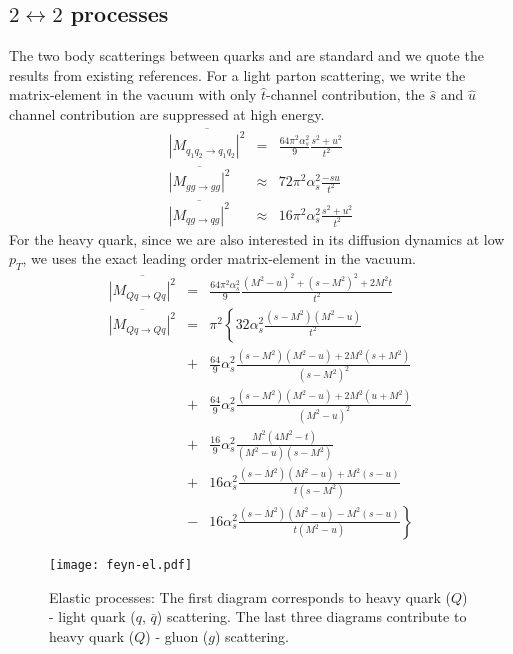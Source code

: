 \subsection{$2\leftrightarrow 2$ processes}
The two body scatterings between quarks and are standard and we quote the results from existing references.
For a light parton scattering, we write the matrix-element in the vacuum with only $\hat{t}$-channel contribution, the $\hat{s}$ and $\hat{u}$ channel contribution are suppressed at high energy.
\begin{eqnarray}
\overline{|M_{q_1q_2\rightarrow q_1q_2}|^2} &=& \frac{64\pi^2 \alpha_s^2}{9} \frac{s^2+u^2}{t^2} \\
\overline{|M_{gg\rightarrow gg}|^2} &\approx& 72\pi^2 \alpha_s^2 \frac{-su}{t^2}
 \\
\overline{|M_{qg\rightarrow qg}|^2} &\approx& 16\pi^2 \alpha_s^2 \frac{s^2+u^2}{t^2}
\end{eqnarray}
For the heavy quark, since we are also interested in its diffusion dynamics at low $p_T$, we uses the exact leading order matrix-element in the vacuum.
\begin{eqnarray}
\overline{|M_{Qq\rightarrow Qq}|^2} &=& \frac{64\pi^2\alpha_s^2}{9} \frac{(M^2-u)^2 + (s-M^2)^2 + 2 M^2 t}{t^2}
\nonumber
\\
\overline{|M_{Qq\rightarrow Qq}|^2} &=& \pi^2 \left\{
32\alpha_s^2 \frac{(s-M^2)(M^2-u)}{t^2} \right.
\nonumber
\\
&+&\frac{64}{9}\alpha_s^2 \frac{(s-M^2)(M^2-u)+2M^2(s+M^2)}{(s-M^2)^2} \nonumber
\\
&+&\frac{64}{9}\alpha_s^2 \frac{(s-M^2)(M^2-u)+2M^2(u+M^2)}{(M^2-u)^2} \nonumber
\\
&+& \frac{16}{9}\alpha_s^2 \frac{M^2(4M^2 - t)}{(M^2-u)(s-M^2)} 
\nonumber
\\
&+& 16 \alpha_s^2 \frac{(s-M^2)(M^2-u)+M^2(s-u)}{t(s-M^2)}
\nonumber
\\
&-& \left. 16 \alpha_s^2 \frac{(s-M^2)(M^2-u)-M^2(s-u)}{t(M^2-u)}\right\}
\end{eqnarray}

\begin{figure}
\texttt{[image: feyn-el.pdf]}
\caption{Elastic processes: The first diagram corresponds to heavy quark ($Q$) - light quark ($q$, $\bar{q}$) scattering. The last three diagrams contribute to heavy quark ($Q$) - gluon ($g$) scattering.}\label{plots:feyn-elastic}
\end{figure}

